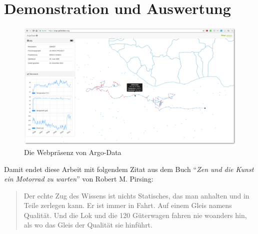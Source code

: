 \section{Demonstration und Auswertung}


\begin{figure}[H]
 \centering
 \includegraphics[width=\textwidth]{pix/argodata_complete.png}
 \caption{Die Webpräsenz von Argo-Data}
 \label{fig:argodataWeb}
\end{figure}




Damit endet diese Arbeit mit folgendem Zitat aus dem Buch "`\textit{Zen und die Kunst ein Motorrad zu warten}"' von Robert M. Pirsing:

\begin{quotation}
 Der echte Zug des Wissens ist nichts Statisches, das man anhalten und in Teile zerlegen kann. Er ist immer in Fahrt. Auf einem Gleis namens Qualität. Und die Lok und die 120 Güterwagen fahren nie woanders hin, als wo das Gleis der Qualität sie hinführt.
\end{quotation} 

